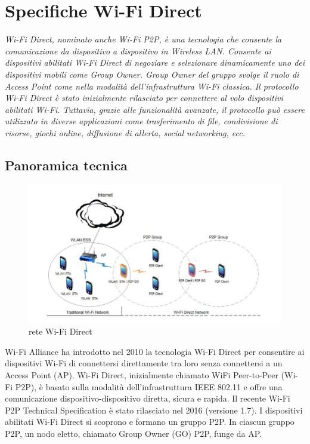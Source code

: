 \chapter{Specifiche Wi-Fi Direct}
\label{chap:basi}

\begin{minipage}{12cm}\textit{
Wi-Fi Direct, nominato anche Wi-Fi P2P, è una tecnologia
che consente la comunicazione da dispositivo a dispositivo in Wireless
LAN. 
Consente ai dispositivi abilitati Wi-Fi Direct di negoziare e selezionare
dinamicamente 
uno dei dispositivi mobili come Group Owner. Group Owner del gruppo
svolge
il ruolo di Access Point come nella modalità dell'infrastruttura Wi-Fi
classica. Il protocollo 
Wi-Fi Direct è stato inizialmente rilasciato per connettere al volo dispositivi
abilitati Wi-Fi. 
Tuttavia, grazie alle funzionalità avanzate, il protocollo può essere
utilizzato in diverse 
applicazioni come trasferimento di file, condivisione di risorse, giochi
online, diffusione di
allerta, social networking, ecc.}

\end{minipage}

\vspace*{1cm}

\section{Panoramica tecnica}

\begin{figure}
\caption{rete Wi-Fi Direct}
\includegraphics[width=1\columnwidth]{imgs/wifip2pnet.jpg} %
\end{figure}


\label{sec:sezioni}
Wi-Fi Alliance ha introdotto nel 2010 la tecnologia Wi-Fi Direct per consentire
ai dispositivi
Wi-Fi di connettersi direttamente tra loro senza connettersi a un Access Point
(AP). Wi-Fi Direct,
inizialmente chiamato WiFi Peer-to-Peer (Wi-Fi P2P), è basato sulla modalità
dell'infrastruttura
IEEE 802.11 e offre una comunicazione dispositivo-dispositivo diretta, sicura e
rapida. Il recente
Wi-Fi P2P Technical Specification \cite{alliance2016wi} è stato rilasciato nel
2016 (versione 1.7).
I dispositivi abilitati Wi-Fi Direct si scoprono e formano un gruppo P2P. In
ciascun gruppo P2P, 
un nodo eletto, chiamato Group Owner (GO) P2P, funge da AP.



